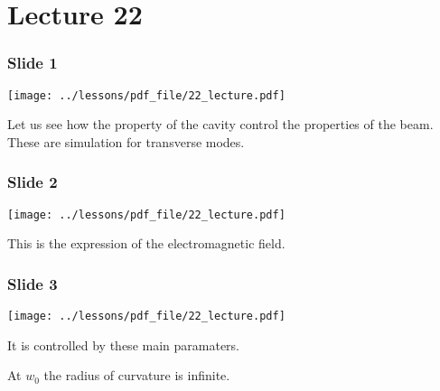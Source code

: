 \documentclass[../main/main.tex]{subfiles}
\begin{document}
\pagestyle{plain}

\section{Lecture 22}


\subsubsection*{Slide 1}

\begin{minipage}[]{0.5\linewidth}
\centering
\texttt{[image: ../lessons/pdf\_file/22\_lecture.pdf]}
\end{minipage}
\hspace{0.3cm}\vspace{0.3cm}
\begin{minipage}[c]{0.47\linewidth}

Let us see how the property of the cavity control the properties of the beam. These are simulation for transverse modes.

\end{minipage}

\subsubsection*{Slide 2}

\begin{minipage}[]{0.5\linewidth}
\centering
\texttt{[image: ../lessons/pdf\_file/22\_lecture.pdf]}
\end{minipage}
\hspace{0.3cm}\vspace{0.3cm}
\begin{minipage}[c]{0.47\linewidth}

This is the expression of the electromagnetic field.

\end{minipage}

\subsubsection*{Slide 3}

\begin{minipage}[]{0.5\linewidth}
\centering
\texttt{[image: ../lessons/pdf\_file/22\_lecture.pdf]}
\end{minipage}
\hspace{0.3cm}\vspace{0.3cm}
\begin{minipage}[c]{0.47\linewidth}

It is controlled by these main paramaters.

At \( w_0 \) the radius of curvature is infinite.

\end{minipage}
\end{document}
